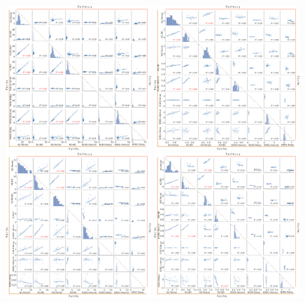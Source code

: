 \begin{figure}[htbp]
	\centering
	\includegraphics[width=0.49\textwidth]{./img/invariants/data/SUSSEX/prep2/images/2phases/output_pairplot_reset_triangle.png}
	\includegraphics[width=0.49\textwidth]{./img/invariants/data/SUSSEX/SO_driven/images/output_pairplot_reset_triangle.png}
	\includegraphics[width=0.49\textwidth]{./img/invariants/data/SUSSEX/MLN_driven/images/output_pairplot_reset_triangle.png}
	\includegraphics[width=0.49\textwidth]{./img/invariants/data/SUSSEX/CV1a_driven1/images/2phases/output_pairplot_reset_triangle.png}

\end{figure}
